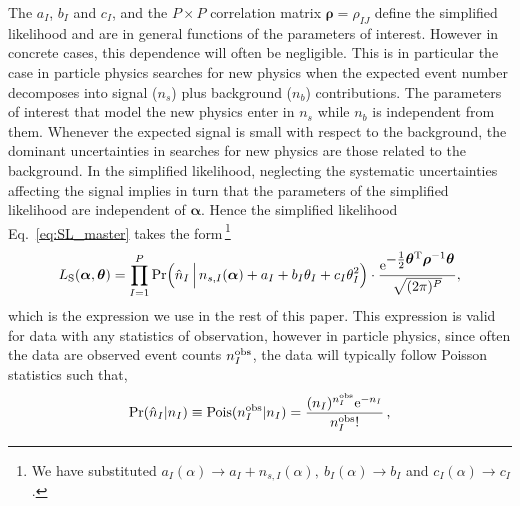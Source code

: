 \documentclass[11pt]{article}
\newcommand{\be}{\begin{equation}}
\newcommand{\ee}{\end{equation}}
\begin{document}
The $a_I$, $b_I$ and $c_I$, and the $P\times P$ correlation matrix $\bm{\rho}=\rho_{IJ}$ define the simplified likelihood and are in general functions of the parameters of interest. However in concrete cases, this dependence will often be negligible. This is in particular the case in particle physics searches for new physics when the expected event number decomposes into signal ($n_s$) plus background ($n_b$) contributions. The parameters of interest that model the new physics enter in $n_s$ while $n_b$ is independent from them.  Whenever the expected signal is small with respect to the background, the dominant uncertainties in searches for new physics are those related to the background.
In the simplified likelihood, neglecting the systematic uncertainties affecting the signal implies in turn that the parameters of the simplified likelihood are independent of $\bm \alpha$. Hence the simplified likelihood Eq.~\eqref{eq:SL_master} takes the form\,\footnote{We have substituted
$a_I(\alpha)\rightarrow a_I+n_{s,I}(\alpha),~b_I(\alpha)\rightarrow b_I$ and $c_I(\alpha)\rightarrow c_I$.}
\begin{equation}
 L_{\rm{S}}(\bm{\alpha},\bm{\theta})=
\prod_{I=1}^P \mathrm{Pr}\Big( \hat{n}_I \, \Big| \, n_{s,I}(\bm{\alpha})+a_I+ b_I\theta_I+c_I\theta_I^2  \Big) \cdot
\frac{ \mathrm{e}^{ \textstyle-\frac{1}{2}\bm{\theta}^\mathrm{T} \bm{\rho}^{-1} \bm{\theta} }}{\sqrt{(2\pi)^P}},
\label{eq:SL_LHC}
\end{equation}
which is the expression we use in the rest of this paper. This expression is valid for data with any statistics of observation, however in particle physics, since often the data
are observed event counts $n_{I}^{\rm{obs}}$, the data will typically follow Poisson statistics such that,
\be
\textrm{Pr}(\hat{n}_{I}|n_{I})\equiv \textrm{Pois}({n}^{\rm{obs}}_{I}|n_{I}) = \dfrac{(n_{I})^{{n}^{\rm{obs}}_{I}} \mathrm{e}^{-n_{I}}}{{n}^{\rm{obs}}_{I}!} \, ,
\ee
\end{document}
